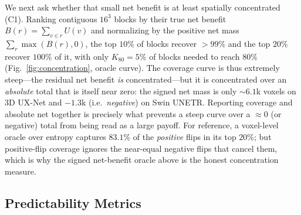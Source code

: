 We next ask whether that small net benefit is at least spatially concentrated (C1).
Ranking contiguous $16^3$ blocks by their true net benefit $B(r)=\sum_{v\in r}U(v)$ and
normalizing by the positive net mass $\sum_r\max(B(r),0)$, the top $10\%$ of blocks
recover ${>}99\%$ and the top $20\%$ recover $100\%$ of it, with only $K_{80}=5\%$ of
blocks needed to reach $80\%$ (Fig.~\ref{fig:concentration}, oracle curve).  The coverage
curve is thus extremely steep---the residual net benefit \emph{is} concentrated---but it
is concentrated over an \emph{absolute} total that is itself near zero: the signed net
mass is only ${\sim}6.1$k voxels on 3D UX-Net and $-1.3$k (i.e.\ \emph{negative}) on Swin
UNETR.  Reporting coverage and absolute net together is precisely what prevents a steep
curve over a ${\approx}0$ (or negative) total from being read as a large payoff.  For
reference, a voxel-level oracle over entropy captures $83.1\%$ of the \emph{positive}
flips in its top $20\%$; but positive-flip coverage ignores the near-equal negative flips
that cancel them, which is why the signed net-benefit oracle above is the honest
concentration measure.

\subsection{Predictability Metrics}
\label{sec:predictability}

\begin{table}[t]
\centering
\caption{P1: subject-level AUROC of efficient-model entropy (3D UX-Net) for three
progressively harder flip-prediction targets. Entropy locates \emph{where} predictions
change ($0.90$) but is only weakly informative about \emph{whether} they improve
(direction $0.59$).}
\label{tab:pred}
\end{table}

